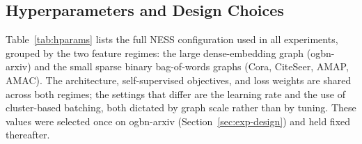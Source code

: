 \subsection{Hyperparameters and Design Choices}
\label{sec:setup-hparams}

Table~\ref{tab:hparams} lists the full NESS configuration used in all experiments, grouped by the two feature regimes: the large dense-embedding graph (ogbn-arxiv) and the small sparse binary bag-of-words graphs (Cora, CiteSeer, AMAP, AMAC). The architecture, self-supervised objectives, and loss weights are shared across both regimes; the settings that differ are the learning rate and the use of cluster-based batching, both dictated by graph scale rather than by tuning. These values were selected once on ogbn-arxiv (Section~\ref{sec:exp-design}) and held fixed thereafter.

